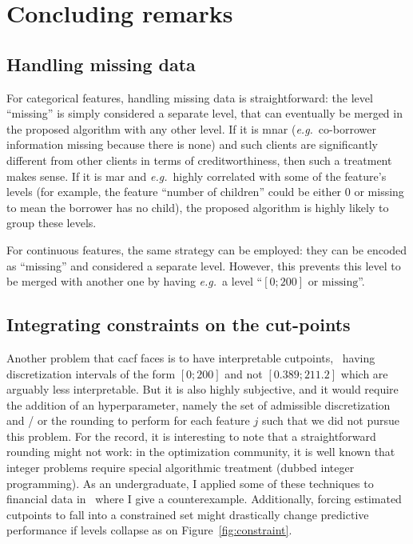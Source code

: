 \section{Concluding remarks}

\subsection{Handling missing data}

For categorical features, handling missing data is straightforward: the level ``missing'' is simply considered a separate level, that can eventually be merged in the proposed algorithm with any other level. If it is \gls{mnar} (\textit{e.g.}\ co-borrower information missing because there is none) and such clients are significantly different from other clients in terms of creditworthiness, then such a treatment makes sense. If it is \gls{mar} and \textit{e.g.}\ highly correlated with some of the feature's levels (for example, the feature ``number of children'' could be either $0$ or missing to mean the borrower has no child), the proposed algorithm is highly likely to group these levels.

For continuous features, the same strategy can be employed: they can be encoded as ``missing'' and considered a separate level. However, this prevents this level to be merged with another one by having \textit{e.g.}\ a level ``$[0;200] \text{ or missing}$''.

\subsection{Integrating constraints on the cut-points}

Another problem that \gls{cacf} faces is to have interpretable cutpoints, \ having discretization intervals of the form $[0;200]$ and not $[0.389 ; 211.2]$ which are arguably less interpretable. But it is also highly subjective, and it would require the addition of an hyperparameter, namely the set of admissible discretization and / or the rounding to perform for each feature $j$ such that we did not pursue this problem. For the record, it is interesting to note that a straightforward rounding might not work: in the optimization community, it is well known that integer problems require special algorithmic treatment (dubbed integer programming). As an undergraduate, I applied some of these techniques to financial data in~\cite{projet_recherche} where I give a counterexample. Additionally, forcing estimated cutpoints to fall into a constrained set might drastically change predictive performance if levels collapse as on Figure~\ref{fig:constraint}.

